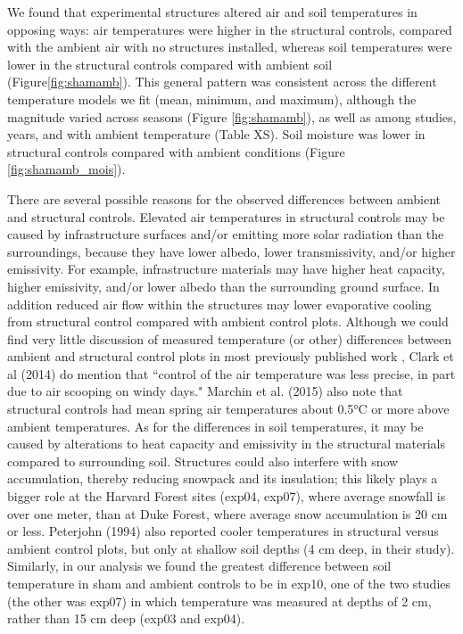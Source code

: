 \documentclass{article}
\begin{document}
\par We found that experimental structures altered air and soil temperatures in opposing ways:  air temperatures were higher in the structural controls, compared with the ambient air with no structures installed, whereas soil temperatures were lower in the structural controls compared with ambient soil (Figure\ref{fig:shamamb}). This general pattern was consistent across the different temperature models we fit (mean, minimum, and maximum), although the magnitude varied across seasons (Figure \ref{fig:shamamb}), as well as among studies, years, and with ambient temperature (Table XS). Soil moisture was lower in structural controls compared with ambient conditions (Figure \ref{fig:shamamb_mois}). 
\par There are several possible reasons for the observed differences between ambient and structural controls. Elevated air temperatures in structural controls may be caused by infrastructure surfaces and/or emitting more solar radiation than the surroundings, because they have lower albedo, lower transmissivity, and/or higher emissivity. For example, infrastructure materials may have higher heat capacity, higher emissivity, and/or lower albedo than the surrounding ground surface. In addition reduced air flow within the structures may lower evaporative cooling from structural control compared with ambient control plots. Although we could find very little discussion of measured temperature (or other) differences between ambient and structural control plots in most previously published work \citep[e.g.][]{farnsworth1995,pelini2011,clark2014a,clark2014b}, Clark et al (2014) do mention that ``control of the air temperature was less precise, in part due to air scooping on windy days." Marchin et al. (2015) also note that structural controls had mean spring air temperatures about 0.5°C or more above ambient temperatures. As for the differences in soil temperatures, it may be caused by alterations to heat capacity and emissivity in the structural materials compared to surrounding soil. Structures could also interfere with snow accumulation, thereby reducing snowpack and its insulation; this likely plays a bigger role at the Harvard Forest sites (exp04, exp07), where average snowfall is over one meter, than at Duke Forest, where average snow accumulation is 20 cm or less. Peterjohn (1994) also reported cooler temperatures in structural versus ambient control plots, but only at shallow soil depths (4 cm deep, in their study). Similarly, in our analysis we found the greatest difference between soil temperature in sham and ambient controls to be in exp10, one of the two studies (the other was exp07) in which temperature was measured at depths of 2 cm, rather than 15 cm deep (exp03 and exp04). 
\end{document}
